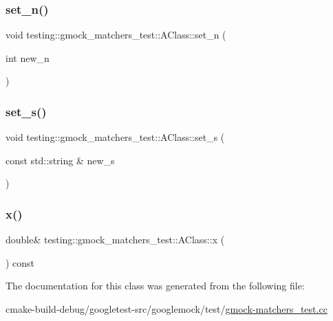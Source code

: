 \mbox{\label{classtesting_1_1gmock__matchers__test_1_1AClass_a3181466cec6faa5ab3c6bc5c4dbf67b2}} 
\subsubsection{\texorpdfstring{set\_n()}{set\_n()}}
{\footnotesize\ttfamily void testing\+::gmock\+\_\+matchers\+\_\+test\+::\+A\+Class\+::set\+\_\+n (\begin{DoxyParamCaption}\item[{int}]{new\+\_\+n }\end{DoxyParamCaption})\hspace{0.3cm}{\ttfamily [inline]}}

\mbox{\label{classtesting_1_1gmock__matchers__test_1_1AClass_a9e2ea4f630928618137cfaadb6298fcf}} 
\subsubsection{\texorpdfstring{set\_s()}{set\_s()}}
{\footnotesize\ttfamily void testing\+::gmock\+\_\+matchers\+\_\+test\+::\+A\+Class\+::set\+\_\+s (\begin{DoxyParamCaption}\item[{const std\+::string \&}]{new\+\_\+s }\end{DoxyParamCaption})\hspace{0.3cm}{\ttfamily [inline]}}

\mbox{\label{classtesting_1_1gmock__matchers__test_1_1AClass_ade61d438cb535d71d0dcc17a1d5bd7cd}} 
\subsubsection{\texorpdfstring{x()}{x()}}
{\footnotesize\ttfamily double\& testing\+::gmock\+\_\+matchers\+\_\+test\+::\+A\+Class\+::x (\begin{DoxyParamCaption}{ }\end{DoxyParamCaption}) const\hspace{0.3cm}{\ttfamily [inline]}}



The documentation for this class was generated from the following file\+:\begin{DoxyCompactItemize}
\item 
cmake-\/build-\/debug/googletest-\/src/googlemock/test/\mbox{\hyperlink{gmock-matchers__test_8cc}{gmock-\/matchers\+\_\+test.\+cc}}\end{DoxyCompactItemize}
